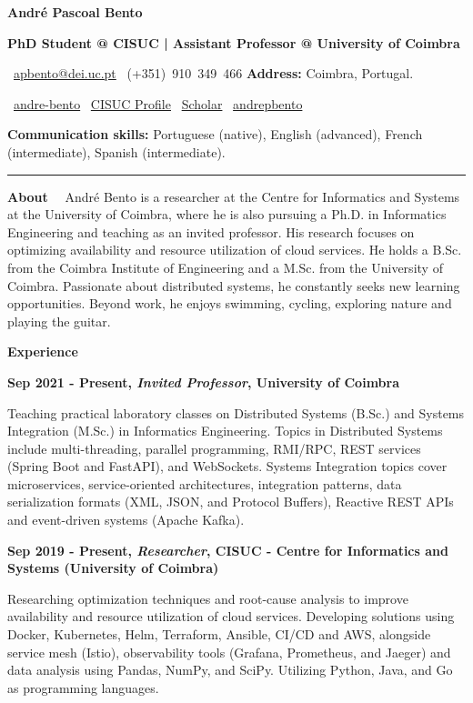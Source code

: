 \documentclass[a4paper,9pt]{memoir}
\newcommand{\cvheading}[1]{{\huge\bfseries\color{RoyalBlue} #1}} %
\newcommand{\cvsubheading}[1]{{\large\bfseries #1} \bigbreak} %
\newcommand{\Sep}{\vspace{1em}} %
\newcommand{\SmallSep}{\vspace{0.5em}} %
\newcommand{\aboutme}[2]{ %
    \textbf{\color{RoyalBlue} #1}~~#2\par\Sep
}
\newcommand{\CVSection}[1]{ %
    {\Large\textbf{#1}}\par
    \SmallSep %
}
\newcommand{\CVItem}[2]{ %
    \textbf{\color{RoyalBlue} #1}\par
    #2
    \SmallSep %
}
\begin{document}
\begin{center}
    \cvheading{\textbf{André Pascoal Bento}}

    \cvsubheading{\Large PhD Student @ CISUC | Assistant Professor @ University of Coimbra}
    
    \faEnvelope~\href{mailto:apbento@dei.uc.pt}{apbento@dei.uc.pt} \quad
    \faPhone~(+351)~910~349~466 \quad
    \textbf{Address:} Coimbra, Portugal.

    \faLinkedin~\href{https://www.linkedin.com/in/andre-bento/?locale=en_US}{andre-bento} \quad
    \faGlobe~\href{https://www.cisuc.uc.pt/en/people/apbento}{CISUC Profile} \quad
    \faGoogle~\href{https://scholar.google.com/citations?user=9Yl9gBwAAAAJ&hl=en}{Scholar} \quad
    \faGithub~\href{https://github.com/andrepbento}{andrepbento}

    \textbf{Communication skills:}
    Portuguese (native),
    English (advanced),
    French (intermediate),
    Spanish (intermediate).
    
    \noindent\rule{\linewidth}{0.4pt}
\end{center}


\aboutme{About}{
André Bento is a researcher at the Centre for Informatics and Systems at the University of Coimbra, where he is also pursuing a Ph.D. in Informatics Engineering and teaching as an invited professor. His research focuses on optimizing availability and resource utilization of cloud services.
%
He holds a B.Sc. from the Coimbra Institute of Engineering and a M.Sc. from the University of Coimbra. Passionate about distributed systems, he constantly seeks new learning opportunities. Beyond work, he enjoys swimming, cycling, exploring nature and playing the guitar.
}

\CVSection{Experience}

\CVItem{Sep 2021 - Present, \textit{Invited Professor}, University of Coimbra}{
    Teaching practical laboratory classes on Distributed Systems (B.Sc.) and Systems Integration (M.Sc.) in Informatics Engineering. Topics in Distributed Systems include multi-threading, parallel programming, RMI/RPC, REST services (Spring Boot and FastAPI), and WebSockets. Systems Integration topics cover microservices, service-oriented architectures, integration patterns, data serialization formats (XML, JSON, and Protocol Buffers), Reactive REST APIs and event-driven systems (Apache Kafka).
}

\CVItem{Sep 2019 - Present, \textit{Researcher}, CISUC - Centre for Informatics and Systems (University of Coimbra)}{
    Researching optimization techniques and root-cause analysis to improve availability and resource utilization of cloud services.
    Developing solutions using Docker, Kubernetes, Helm, Terraform, Ansible, CI/CD and AWS, alongside service mesh (Istio), observability tools (Grafana, Prometheus, and Jaeger) and data analysis using Pandas, NumPy, and SciPy. Utilizing Python, Java, and Go as programming languages.
}
\end{document}
